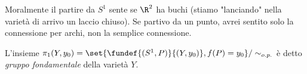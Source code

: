 \begin{oss}
 Moralmente il partire da $S^1$ sente se $\R ^2$ ha buchi (stiamo "lanciando" nella varietà di arrivo un laccio chiuso).
 Se partivo da un punto, avrei sentito solo la connessione per archi, non la semplice connessione.
\end{oss}
\begin{defn}
 L'insieme $\pi_1(Y, y_0)=\set{\fundef{(S^1, P)}{(Y, y_0)}, f(P) = y_0}/\sim_{o.p.}$ è detto \emph{gruppo fondamentale} della varietà $Y$.
\end{defn}

